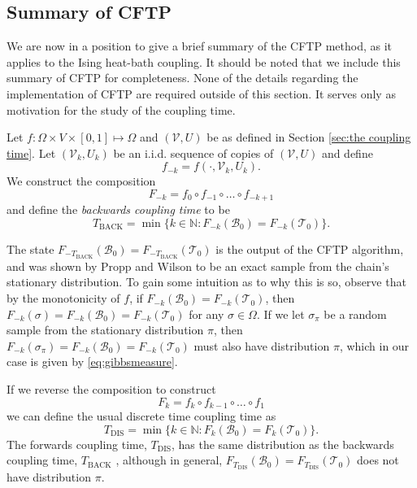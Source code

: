 	

	\subsection{Summary of CFTP}
	\label{sec:summary of CFTP}
	We are now in a position to give a brief summary of the CFTP method, as it applies to the Ising heat-bath coupling. It should be noted that we include this summary of CFTP for completeness. None of the details regarding the implementation of CFTP are required outside of this section. It serves only as motivation for the study of the coupling time.

	Let $f: \Omega \times V \times [0,1] \mapsto \Omega$ and $(\mathcal{V}, U)$ be as defined in Section \ref{sec:the coupling time}. Let $(\mathcal{V}_k, U_k)$ be an i.i.d. sequence of copies of $(\mathcal{V}, U)$ and define 
	\begin{equation}
		f_{-k} = f(\cdot, \mathcal{V}_k, U_k).
	\end{equation}
	We construct the composition
	\begin{equation}
		F_{-k} = f_0 \circ f_{-1} \circ \dots \circ f_{-k+1}
	\end{equation}
	and define the \emph{backwards coupling time} to be
	\begin{equation}
		T_\mathrm{BACK} = \min\{k \in \mathbb{N} : F_{-k}(\mathscr{B}_0) = F_{-k}(\mathscr{T}_0)\}.
	\end{equation}

	The state $F_{-T_\mathrm{BACK}}(\mathscr{B}_0) = F_{-T_\mathrm{BACK}}(\mathscr{T}_0)$ is the output of the CFTP algorithm, and was shown by Propp and Wilson \cite{Propp1996-cf} to be an exact sample from the chain's stationary distribution. To gain some intuition as to why this is so, observe that by the monotonicity of $f$, if $F_{-k}(\mathscr{B}_0) = F_{-k}(\mathscr{T}_0)$, then $F_{-k}(\sigma) = F_{-k}(\mathscr{B}_0)  = F_{-k}(\mathscr{T}_0)$ for any $\sigma \in \Omega$. If we let $\sigma_\pi$ be a random sample from the stationary distribution $\pi$, then $F_{-k}(\sigma_\pi) = F_{-k}(\mathscr{B}_0) = F_{-k}(\mathscr{T}_0)$ must also have distribution $\pi$, which in our case is given by \eqref{eq:gibbsmeasure}.
	
	If we reverse the composition to construct
	\begin{equation}
		F_{k} = f_{k} \circ f_{k-1} \circ \dots \circ f_1
	\end{equation}
	we can define the usual discrete time coupling time as
	\begin{equation}
		T_\mathrm{DIS} =  \min\{k \in \mathbb{N} : F_{k}(\mathscr{B}_0) = F_{k}(\mathscr{T}_0)\}.
	\end{equation}
	The forwards coupling time, $T_\mathrm{DIS}$, has the same distribution as the backwards coupling time, $T_\mathrm{BACK}$ \cite{Propp1996-cf}, although in general, $F_{T_\mathrm{DIS}}(\mathscr{B}_0) = F_{T_\mathrm{DIS}}(\mathscr{T}_0)$ does not have distribution $\pi$.

